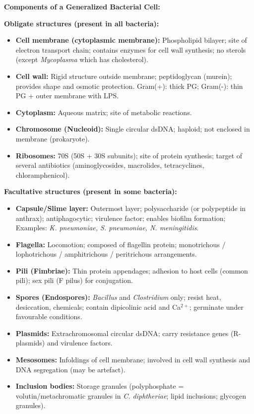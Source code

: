 \documentclass[11pt,a4paper]{article}
\begin{document}
\begin{ansbox}
\textbf{Components of a Generalized Bacterial Cell:}

\textbf{Obligate structures (present in all bacteria):}
\begin{itemize}[leftmargin=*]
    \item \textbf{Cell membrane (cytoplasmic membrane):} Phospholipid bilayer; site of electron transport chain; contains enzymes for cell wall synthesis; no sterols (except \textit{Mycoplasma} which has cholesterol).
    \item \textbf{Cell wall:} Rigid structure outside membrane; peptidoglycan (murein); provides shape and osmotic protection. Gram(+): thick PG; Gram(-): thin PG + outer membrane with LPS.
    \item \textbf{Cytoplasm:} Aqueous matrix; site of metabolic reactions.
    \item \textbf{Chromosome (Nucleoid):} Single circular dsDNA; haploid; not enclosed in membrane (prokaryote).
    \item \textbf{Ribosomes:} 70S (50S + 30S subunits); site of protein synthesis; target of several antibiotics (aminoglycosides, macrolides, tetracyclines, chloramphenicol).
\end{itemize}

\textbf{Facultative structures (present in some bacteria):}
\begin{itemize}[leftmargin=*]
    \item \textbf{Capsule/Slime layer:} Outermost layer; polysaccharide (or polypeptide in anthrax); antiphagocytic; virulence factor; enables biofilm formation; Examples: \textit{K. pneumoniae, S. pneumoniae, N. meningitidis}.
    \item \textbf{Flagella:} Locomotion; composed of flagellin protein; monotrichous / lophotrichous / amphitrichous / peritrichous arrangements.
    \item \textbf{Pili (Fimbriae):} Thin protein appendages; adhesion to host cells (common pili); sex pili (F pilus) for conjugation.
    \item \textbf{Spores (Endospores):} \textit{Bacillus} and \textit{Clostridium} only; resist heat, desiccation, chemicals; contain dipicolinic acid and Ca$^{2+}$; germinate under favourable conditions.
    \item \textbf{Plasmids:} Extrachromosomal circular dsDNA; carry resistance genes (R-plasmids) and virulence factors.
    \item \textbf{Mesosomes:} Infoldings of cell membrane; involved in cell wall synthesis and DNA segregation (may be artefact).
    \item \textbf{Inclusion bodies:} Storage granules (polyphosphate = volutin/metachromatic granules in \textit{C. diphtheriae}; lipid inclusions; glycogen granules).
\end{itemize}
\end{ansbox}
\end{document}
